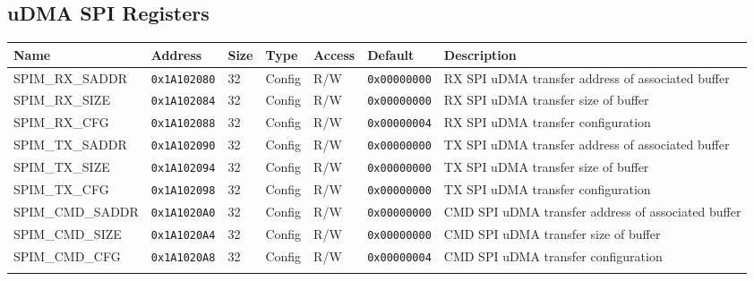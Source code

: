 
\subsection{uDMA SPI Registers}
{\small
\begin{tabularx}{\textwidth}{|l|l|l|l|l|l|X|}
  \hline
  \textbf{Name} & \textbf{Address}  & \textbf{Size} & \textbf{Type} & \textbf{Access} & \textbf{Default} & \textbf{Description} \\
  \hline
  SPIM\_RX\_SADDR & \texttt{0x1A102080} & 32 & Config & R/W & \texttt{0x00000000} & RX SPI uDMA transfer address of associated buffer\\
  \hline
  SPIM\_RX\_SIZE & \texttt{0x1A102084} & 32 & Config & R/W & \texttt{0x00000000} & RX SPI uDMA transfer size of buffer\\
  \hline
  SPIM\_RX\_CFG & \texttt{0x1A102088} & 32 & Config & R/W & \texttt{0x00000004} & RX SPI uDMA transfer configuration\\
  \hline
  SPIM\_TX\_SADDR & \texttt{0x1A102090} & 32 & Config & R/W & \texttt{0x00000000} & TX SPI uDMA transfer address of associated buffer\\
  \hline
  SPIM\_TX\_SIZE & \texttt{0x1A102094} & 32 & Config & R/W & \texttt{0x00000000} & TX SPI uDMA transfer size of buffer\\
  \hline
  SPIM\_TX\_CFG & \texttt{0x1A102098} & 32 & Config & R/W & \texttt{0x00000000} & TX SPI uDMA transfer configuration\\
  \hline
  SPIM\_CMD\_SADDR & \texttt{0x1A1020A0} & 32 & Config & R/W & \texttt{0x00000000} & CMD SPI uDMA transfer address of associated buffer\\
  \hline
  SPIM\_CMD\_SIZE & \texttt{0x1A1020A4} & 32 & Config & R/W & \texttt{0x00000000} & CMD SPI uDMA transfer size of buffer\\
  \hline
  SPIM\_CMD\_CFG & \texttt{0x1A1020A8} & 32 & Config & R/W & \texttt{0x00000004} & CMD SPI uDMA transfer configuration\\
  \hline
  \caption{uDMA SPI}
\end{tabularx}
}





